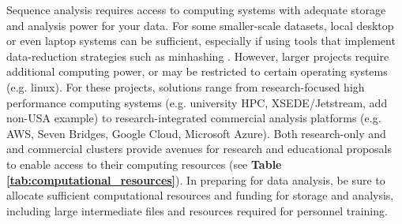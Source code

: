 \documentclass[10pt,letterpaper]{article}
\begin{document}
Sequence analysis requires access to computing systems with adequate storage and analysis power for your data. 
For some smaller-scale datasets, local desktop or even laptop systems can be sufficient, especially if using tools that implement data-reduction strategies such as minhashing \cite{rowe2019streaming}. 
However, larger projects require additional computing power, or may be restricted to certain operating systems (e.g. linux). 
For these projects, solutions range from research-focused high performance computing systems (e.g. university HPC, XSEDE/Jetstream, add non-USA example) to research-integrated commercial analysis platforms (e.g. AWS, Seven Bridges, Google Cloud, Microsoft Azure). 
Both research-only and  and commercial clusters provide avenues for research and educational proposals to enable access to their computing resources (see \textbf{Table \ref{tab:computational_resources}}). 
In preparing for data analysis, be sure to allocate sufficient computational resources and funding for storage and analysis, including large intermediate files and resources required for personnel training. 

\begin{table}
\caption{\label{tab:computational_resources} \textbf{Research cloud resources} Cloud provider indicates the name of the cloud, standard model indicates the most common route toward using the cloud, and limitations indicates limitations in access or services provided by the cloud.}
\end{table}
\end{document}
